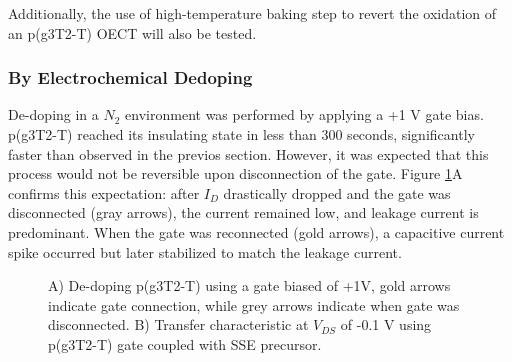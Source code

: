 Additionally, the use of high-temperature baking step to revert the oxidation of an p(g3T2-T) OECT %
will also be tested.   

\subsubsection{By Electrochemical Dedoping}
De-doping in a $N_{2}$ environment was performed by applying a +1 V gate bias. p(g3T2-T) reached its insulating state in less than 300 seconds, significantly faster than observed in the previos section. However, it was expected that this process would not be reversible upon disconnection of the gate. Figure \ref{fig:revox2}A confirms this expectation: after $I_{D}$ drastically dropped and the gate was disconnected (gray arrows), the current remained low, and leakage current is predominant. When the gate was reconnected (gold arrows), a capacitive current spike occurred but later stabilized to match the leakage current.

\begin{figure}[ht]
    \centering
    \caption[Electrochemical de-doping of oxidized p(g3T2-T) OECT]{A) De-doping p(g3T2-T) using a gate biased of +1V, gold arrows indicate gate connection, while grey arrows indicate when gate was disconnected. B) Transfer characteristic at $V_{DS}$ of -0.1 V using p(g3T2-T) gate coupled with SSE precursor.}
    \label{fig:revox2}
\end{figure}

